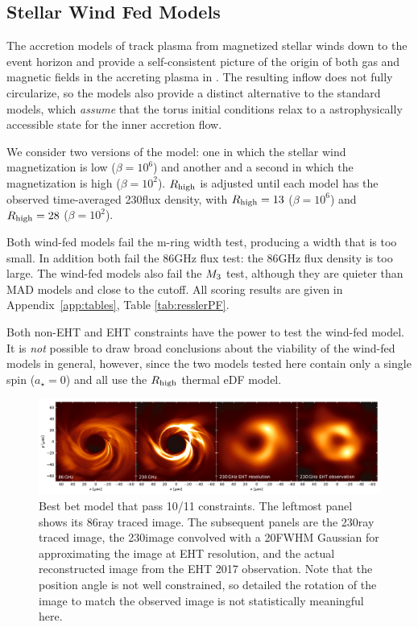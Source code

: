 \subsection{Stellar Wind Fed Models}

The accretion models of \cite{2020ApJ...896L...6R, 2020MNRAS.492.3272R, 2018MNRAS.478.3544R} track plasma from  magnetized stellar winds down to the event horizon and provide a self-consistent picture of the origin of both gas and magnetic fields in the accreting plasma in \sgra.  The resulting inflow does not fully circularize, so the models also provide a distinct alternative to the standard models, which {\em assume} that the torus initial conditions relax to a astrophysically accessible state for the inner accretion flow.

We consider two versions of the model: one in which the stellar wind magnetization is low ($\beta = 10^6$) and another and a second in which the magnetization is high ($\beta = 10^2$). $R_\mathrm{high}$ is adjusted until each model has the observed time-averaged 230\GHz flux density, with $R_\mathrm{high} = 13$ ($\beta = 10^6$) and $R_\mathrm{high} = 28$ ($\beta = 10^2$).

Both wind-fed models fail the m-ring width test, producing a width that is too small.  In addition both fail the 86GHz flux test: the 86GHz flux density is too large.  The wind-fed models also fail the $M_{3}$ test, although they are quieter than MAD models and close to the cutoff.   All scoring results are given in Appendix~\ref{app:tables}, Table \ref{tab:resslerPF}.

Both non-EHT and EHT constraints have the power to test the wind-fed model.  It is {\em not} possible to draw broad conclusions about the viability of the wind-fed models in general, however, since the two models tested here contain only a single spin ($a_\star=0$) and all use the $R_\mathrm{high}$ thermal eDF model.

\begin{figure}
  \centering
  \includegraphics[width=\textwidth]{figures/bestbet_imgs.pdf}
  \caption{Best bet model that pass 10/11 constraints.
    The leftmost panel shows its 86\GHz ray traced image.
    The subsequent panels are the 230\GHz ray traced image,
    the 230\GHz image convolved with a 20\uas FWHM Gaussian for approximating the image at EHT resolution, and
    the actual reconstructed image from the EHT 2017 observation.
    Note that the position angle is not well constrained, so detailed the rotation of the image to match the observed image is not statistically meaningful here.}
  \label{fig:bestbet_imgs}
\end{figure}

